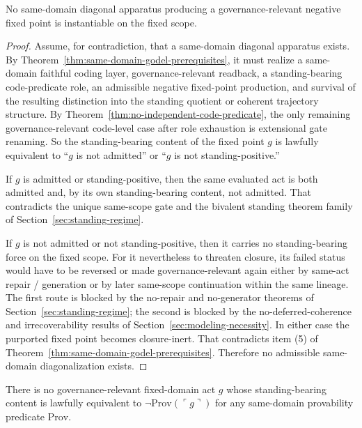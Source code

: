 \begin{theorem}
\label{thm:no-same-domain-diagonalization}
No same-domain diagonal apparatus producing a governance-relevant negative fixed point is instantiable on the fixed scope.
\end{theorem}

\begin{proof}
Assume, for contradiction, that a same-domain diagonal apparatus exists. By Theorem~\ref{thm:same-domain-godel-prerequisites}, it must realize a same-domain faithful coding layer, governance-relevant readback, a standing-bearing code-predicate role, an admissible negative fixed-point production, and survival of the resulting distinction into the standing quotient or coherent trajectory structure. By Theorem~\ref{thm:no-independent-code-predicate}, the only remaining governance-relevant code-level case after role exhaustion is extensional gate renaming. So the standing-bearing content of the fixed point $g$ is lawfully equivalent to ``$g$ is not admitted'' or ``$g$ is not standing-positive.''

If $g$ is admitted or standing-positive, then the same evaluated act is both admitted and, by its own standing-bearing content, not admitted. That contradicts the unique same-scope gate and the bivalent standing theorem family of Section~\ref{sec:standing-regime}.

If $g$ is not admitted or not standing-positive, then it carries no standing-bearing force on the fixed scope. For it nevertheless to threaten closure, its failed status would have to be reversed or made governance-relevant again either by same-act repair / generation or by later same-scope continuation within the same lineage. The first route is blocked by the no-repair and no-generator theorems of Section~\ref{sec:standing-regime}; the second is blocked by the no-deferred-coherence and irrecoverability results of Section~\ref{sec:modeling-necessity}. In either case the purported fixed point becomes closure-inert. That contradicts item (5) of Theorem~\ref{thm:same-domain-godel-prerequisites}. Therefore no admissible same-domain diagonalization exists.
\end{proof}

\begin{corollary}
There is no governance-relevant fixed-domain act $g$ whose standing-bearing content is lawfully equivalent to $\neg\mathrm{Prov}(\ulcorner g\urcorner)$ for any same-domain provability predicate $\mathrm{Prov}$.
\end{corollary}

